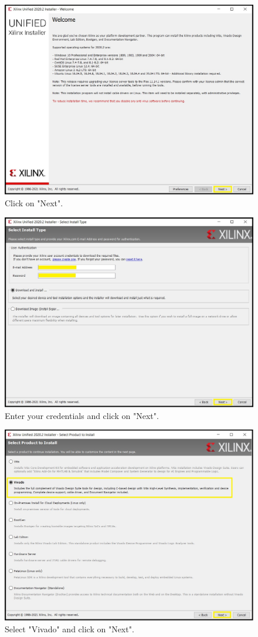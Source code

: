 \begin{figure}[H]
\centering
  \includegraphics[width=0.8\linewidth]{images/VivadoInstimg008.jpg}
  \captionsetup{width=0.8\linewidth}
  \caption{Click on "Next".}
  \label{fig:VivadoInstimg008}
\end{figure}

\begin{figure}[H]
\centering
  \includegraphics[width=0.8\linewidth]{images/VivadoInstimg009.jpg}
  \captionsetup{width=0.8\linewidth}
  \caption{Enter your credentials and click on "Next".}
  \label{fig:VivadoInstimg009}
\end{figure}

\begin{figure}[H]
\centering
  \includegraphics[width=0.8\linewidth]{images/VivadoInstimg010.jpg}
  \captionsetup{width=0.8\linewidth}
  \caption{Select "Vivado" and click on "Next".}
  \label{fig:VivadoInstimg010}
\end{figure}

